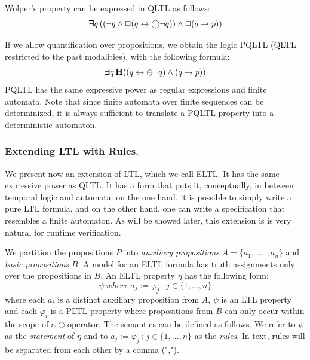 \noindent
Wolper's property can be expressed in QLTL as follows:
\begin{equation} \label{form0} \bm{\exists}\kern-0.6em\bm{\exists} q \,
( (  \neg q \wedge \Box (q \leftrightarrow \bigcirc \neg q )  )  \wedge \Box (q \rightarrow p ) )\end{equation}


If we allow
quantification over propositions, we obtain the logic PQLTL
(QLTL restricted to the past modalities), with the following formula:
\begin{equation} \label{form1} \bm{\exists}\kern-0.6em\bm{\exists} q \,
{\bf H} (( q \leftrightarrow \ominus \neg q )   \wedge (q \rightarrow p ) )\end{equation}
PQLTL has the same expressive
power as regular expressions and finite automata.
Note that since finite automata over finite sequences can be determinized, it is always sufficient to translate a
PQLTL property into a deterministic
automaton.


\subsubsection{Extending LTL with Rules.}

We present now an extension of LTL, which we call ELTL. It has the same
expressive power as  QLTL.
It has a form that puts it, conceptually, in between temporal
logic and automata: on the one hand, it is possible to simply write
a pure LTL formula, and on the other hand, one can write a specification that resembles a finite automaton. As will be showed later, this extension is
is very natural for runtime verification.

We partition the propositions $P$ into
{\em auxiliary propositions} $A = \{ a_1 , \; \ldots\; , a_n \}$
and {\em basic propositions} $B$. A model for an ELTL formula has truth assignments only over the propositions in $B$.
An ELTL property $\eta$ has the following form: 
\begin{equation} \label{ELTL}
\psi \mathit{\ where\ } a_j  := \varphi_j \, : \, 
 {j \in \{1, \ldots , n\}} \end{equation}
where each $a_i$ is a distinct auxiliary proposition from $A$,
$\psi$ is an LTL property and each $\varphi_i$ 
is a PLTL property where propositions from $B$ can
only occur within the scope of a $\ominus$ operator.
The semantics can be defined as follows. We refer to $\psi$
as the {\em statement} of $\eta$ and to 
$a_j  := \varphi_j \, : \, 
 {j \in \{1, \ldots , n\}}$ as the {\em rules}. In text, rules
 will be separated from each other by a comma (",").

